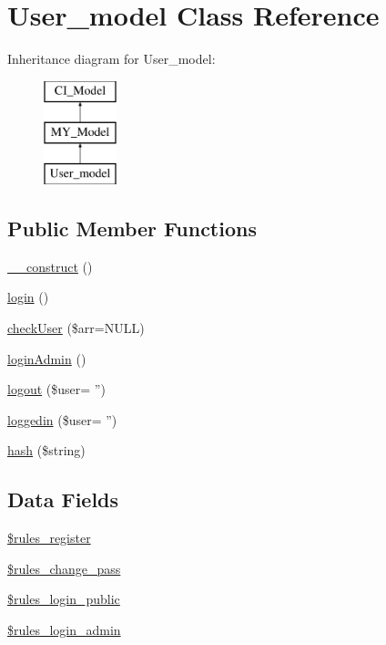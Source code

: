 \hypertarget{class_user__model}{\section{User\-\_\-model Class Reference}
\label{class_user__model}
}
Inheritance diagram for User\-\_\-model\-:\begin{figure}[H]
\begin{center}
\leavevmode
\includegraphics[height=3.000000cm]{class_user__model}
\end{center}
\end{figure}
\subsection*{Public Member Functions}
\begin{DoxyCompactItemize}
\item 
\hyperlink{class_user__model_a095c5d389db211932136b53f25f39685}{\-\_\-\-\_\-construct} ()
\item 
\hyperlink{class_user__model_aa311da27ba5706f5710cea7706c8eae1}{login} ()
\item 
\hyperlink{class_user__model_aa2a0022910e3c5fc6745a4a5cf176c6a}{check\-User} (\$arr=N\-U\-L\-L)
\item 
\hyperlink{class_user__model_a0dab4ed4837079df1f99f2abf75a7059}{login\-Admin} ()
\item 
\hyperlink{class_user__model_a8667b2e84e73dc43061d1c2875f85fc2}{logout} (\$user= '')
\item 
\hyperlink{class_user__model_a0d600eb6362d9883ad40a387cdb8c5fc}{loggedin} (\$user= '')
\item 
\hyperlink{class_user__model_a88149c258d341770c369668be6200907}{hash} (\$string)
\end{DoxyCompactItemize}
\subsection*{Data Fields}
\begin{DoxyCompactItemize}
\item 
\hyperlink{class_user__model_a0f3f8ec0bddafbf99975029a3670d58b}{\$rules\-\_\-register}
\item 
\hyperlink{class_user__model_adf938552f461a7e300f74469c1837bbf}{\$rules\-\_\-change\-\_\-pass}
\item 
\hyperlink{class_user__model_af7b4f78bd5365476e9ae516a51b34581}{\$rules\-\_\-login\-\_\-public}
\item 
\hyperlink{class_user__model_ad7c8625130f74e93047c9a368cea42b0}{\$rules\-\_\-login\-\_\-admin}
\end{DoxyCompactItemize}
